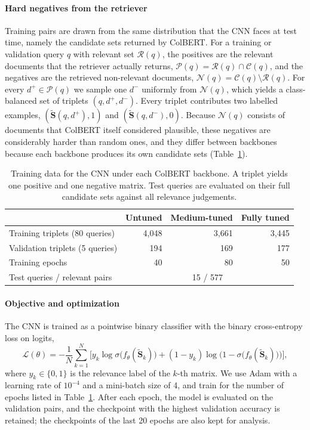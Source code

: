 \documentclass[preprint,5p,times,twocolumn,authoryear]{elsarticle}
\begin{document}
\paragraph{Hard negatives from the retriever}
Training pairs are drawn from the same distribution that the CNN faces at test time, namely the candidate sets returned by ColBERT. For a training or validation query $q$ with relevant set $\mathcal{R}(q)$, the positives are the relevant documents that the retriever actually returns, $\mathcal{P}(q)=\mathcal{R}(q)\cap\mathcal{C}(q)$, and the negatives are the retrieved non-relevant documents, $\mathcal{N}(q)=\mathcal{C}(q)\setminus\mathcal{R}(q)$. For every $d^{+}\in\mathcal{P}(q)$ we sample one $d^{-}$ uniformly from $\mathcal{N}(q)$, which yields a class-balanced set of triplets $(q,d^{+},d^{-})$. Every triplet contributes two labelled examples, $(\tilde{\mathbf{S}}(q,d^{+}),1)$ and $(\tilde{\mathbf{S}}(q,d^{-}),0)$. Because $\mathcal{N}(q)$ consists of documents that ColBERT itself considered plausible, these negatives are considerably harder than random ones, and they differ between backbones because each backbone produces its own candidate sets (Table~\ref{tab:splits}).

\begin{table}[t]
\centering
\footnotesize
\caption{Training data for the CNN under each ColBERT backbone. A triplet yields one positive and one negative matrix. Test queries are evaluated on their full candidate sets against all relevance judgements.}
\label{tab:splits}
\begin{tabular}{@{}lrrr@{}}
\toprule
 & Untuned & Medium-tuned & Fully tuned \\
\midrule
Training triplets (80 queries) & 4{,}048 & 3{,}661 & 3{,}445 \\
Validation triplets (5 queries) & 194 & 169 & 177 \\
Training epochs & 40 & 80 & 50 \\
\midrule
Test queries / relevant pairs & \multicolumn{3}{c}{15 / 577} \\
\bottomrule
\end{tabular}
\end{table}

\paragraph{Objective and optimization}
The CNN is trained as a pointwise binary classifier with the binary cross-entropy loss on logits,
\begin{equation}
\mathcal{L}(\theta) = -\frac{1}{N}\sum_{k=1}^{N}\Big[y_k\log\sigma\big(f_\theta(\tilde{\mathbf{S}}_k)\big) + (1-y_k)\log\Big(1-\sigma\big(f_\theta(\tilde{\mathbf{S}}_k)\big)\Big)\Big],
\label{eq:bce}
\end{equation}
where $y_k\in\{0,1\}$ is the relevance label of the $k$-th matrix. We use Adam \citep{Kingma2014Adam} with a learning rate of $10^{-4}$ and a mini-batch size of 4, and train for the number of epochs listed in Table~\ref{tab:splits}. After each epoch, the model is evaluated on the validation pairs, and the checkpoint with the highest validation accuracy is retained; the checkpoints of the last 20 epochs are also kept for analysis.
\end{document}
